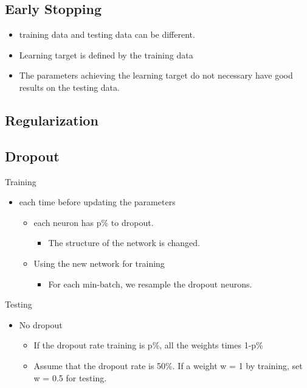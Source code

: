 \documentclass[
]{book}
\providecommand{\tightlist}{%
  \setlength{\itemsep}{0pt}\setlength{\parskip}{0pt}}
\begin{document}
\hypertarget{early-stopping}{%
\subsection{Early Stopping}\label{early-stopping}}

\begin{itemize}
\tightlist
\item
  training data and testing data can be different.
\item
  Learning target is defined by the training data
\item
  The parameters achieving the learning target do not necessary have good results on the testing data.
\end{itemize}

\hypertarget{regularization}{%
\subsection{Regularization}\label{regularization}}

\hypertarget{dropout}{%
\subsection{Dropout}\label{dropout}}

Training

\begin{itemize}
\item
  each time before updating the parameters

  \begin{itemize}
  \item
    each neuron has p\% to dropout.

    \begin{itemize}
    \tightlist
    \item
      The structure of the network is changed.
    \end{itemize}
  \item
    Using the new network for training

    \begin{itemize}
    \tightlist
    \item
      For each min-batch, we resample the dropout neurons.
    \end{itemize}
  \end{itemize}
\end{itemize}

Testing

\begin{itemize}
\item
  No dropout

  \begin{itemize}
  \tightlist
  \item
    If the dropout rate training is p\%, all the weights times 1-p\%
  \item
    Assume that the dropout rate is 50\%. If a weight w = 1 by training, set w = 0.5 for testing.
  \end{itemize}
\end{itemize}
\end{document}
